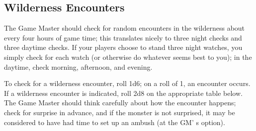 \documentclass[a4paper,twoside,openany,10pt]{book}
\begin{document}
\subsection{Wilderness Encounters}\label{wilderness-encounters}

The Game Master should check for random encounters in the wilderness about every four hours of game time; this translates nicely to three night checks and three daytime checks. If your players choose to stand three night watches, you simply check for each watch (or otherwise do whatever seems best to you); in the daytime, check morning, afternoon, and evening.

To check for a wilderness encounter, roll 1d6; on a roll of 1, an encounter occurs. If a wilderness encounter is indicated, roll 2d8 on the appropriate table below. The Game Master should think carefully about how the encounter happens; check for surprise in advance, and if the monster is not surprised, it may be considered to have had time to set up an ambush (at the GM' s option).\medskip
\end{document}

